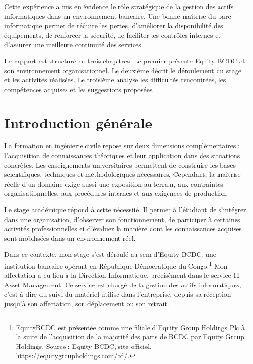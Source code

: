\documentclass[12pt,a4paper]{report}
\let\cleardoublepage\clearpage
\begin{document}
Cette expérience a mis en évidence le rôle stratégique de la gestion des actifs informatiques dans un environnement bancaire. Une bonne maîtrise du parc informatique permet de réduire les pertes, d'améliorer la disponibilité des équipements, de renforcer la sécurité, de faciliter les contrôles internes et d'assurer une meilleure continuité des services.

Le rapport est structuré en trois chapitres. Le premier présente Equity BCDC et son environnement organisationnel. Le deuxième décrit le déroulement du stage et les activités réalisées. Le troisième analyse les difficultés rencontrées, les compétences acquises et les suggestions proposées.

\tableofcontents
\listoffigures

\cleardoublepage
{}

\chapter*{Introduction générale}

La formation en ingénierie civile repose sur deux dimensions complémentaires : l'acquisition de connaissances théoriques et leur application dans des situations concrètes. Les enseignements universitaires permettent de construire les bases scientifiques, techniques et méthodologiques nécessaires. Cependant, la maîtrise réelle d'un domaine exige aussi une exposition au terrain, aux contraintes organisationnelles, aux procédures internes et aux exigences de production.

Le stage académique répond à cette nécessité. Il permet à l'étudiant de s'intégrer dans une organisation, d'observer son fonctionnement, de participer à certaines activités professionnelles et d'évaluer la manière dont les connaissances acquises sont mobilisées dans un environnement réel.

Dans ce contexte, mon stage s'est déroulé au sein d'Equity BCDC, une institution bancaire opérant en République Démocratique du Congo.\footnote{EquityBCDC est présentée comme une filiale d'Equity Group Holdings Plc à la suite de l'acquisition de la majorité des parts de BCDC par Equity Group Holdings. Source : Equity BCDC, site officiel, \url{https://equitygroupholdings.com/cd/}.} Mon affectation a eu lieu à la Direction Informatique, précisément dans le service IT-Asset Management. Ce service est chargé de la gestion des actifs informatiques, c'est-à-dire du suivi du matériel utilisé dans l'entreprise, depuis sa réception jusqu'à son affectation, son déplacement ou son retrait.
\end{document}
